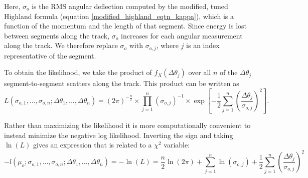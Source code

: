 \documentclass[a4paper,11pt]{article}
\begin{document}
Here, $\sigma_o$ is the RMS angular deflection computed by the modified, tuned Highland formula (equation \ref{modified_highland_eqtn_kappa}), which is a function of the momentum and the length of that segment. Since energy is lost between segments along the track, $\sigma_o$ increases for each angular measurement along the track. We therefore replace $\sigma_o$ with $\sigma_{o,j}$, where $j$ is an index representative of the segment. \newline

To obtain the likelihood, we take the product of $f_X(\Delta\theta_j)$ over all $n$ of the $\Delta\theta_j$ segment-to-segment scatters along the track. This product can be written as
\begin{equation}
L(\sigma_{o,1},...,\sigma_{o,n};\Delta\theta_1,...,\Delta\theta_n) = (2\pi)^{-\frac{n}{2}}\times\prod_{j=1}^{n}(\sigma_{o,j})^{-1} \times \exp\left[-\frac{1}{2}\sum_{j=1}^{n}\left(\frac{\Delta\theta_j}{\sigma_{o,j}}\right)^2\right].
\end{equation}

Rather than maximizing the likelihood it is more computationally convenient to instead minimize the negative log likelihood. Inverting the sign and taking $\ln(L)$ gives an expression that is related to a $\chi^2$ variable:
\begin{equation}\label{leo_llhd_eqtn}
-l(\mu_o;\sigma_{o,1},...,\sigma_{o,n};\Delta\theta_1,...,\Delta\theta_n) = -\ln(L) = \frac{n}{2}\ln(2\pi) + \sum_{j=1}^{n}\ln(\sigma_{o,j}) + \frac{1}{2}\sum_{j=1}^{n}\left(\frac{\Delta\theta_j}{\sigma_{o,j}}\right)^2
\end{equation}


\end{document}
